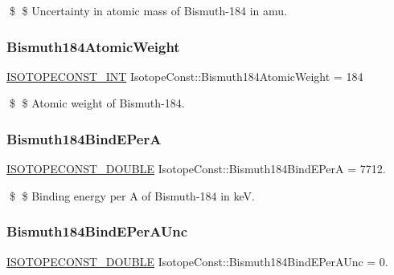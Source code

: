\$ \$ Uncertainty in atomic mass of Bismuth-\/184 in amu. \mbox{\label{group___isotope_const-_bismuth-_bi184_gae0976f524a59eb33facb56944e5ba512}} 
\subsubsection{\texorpdfstring{Bismuth184\+Atomic\+Weight}{Bismuth184AtomicWeight}}
{\footnotesize\ttfamily \mbox{\hyperlink{group___isotope_const-_macros_ga5f18360b3e99483a35c32d789e62621c}{I\+S\+O\+T\+O\+P\+E\+C\+O\+N\+S\+T\+\_\+\+I\+NT}} Isotope\+Const\+::\+Bismuth184\+Atomic\+Weight = 184}

\$ \$ Atomic weight of Bismuth-\/184. \mbox{\label{group___isotope_const-_bismuth-_bi184_ga8c356a8ee5f8ec16923a91de44a782a7}} 
\subsubsection{\texorpdfstring{Bismuth184\+Bind\+E\+PerA}{Bismuth184BindEPerA}}
{\footnotesize\ttfamily \mbox{\hyperlink{group___isotope_const-_macros_ga8f45a7272ce02c0b4c65c44636ed719a}{I\+S\+O\+T\+O\+P\+E\+C\+O\+N\+S\+T\+\_\+\+D\+O\+U\+B\+LE}} Isotope\+Const\+::\+Bismuth184\+Bind\+E\+PerA = 7712.}

\$ \$ Binding energy per A of Bismuth-\/184 in keV. \mbox{\label{group___isotope_const-_bismuth-_bi184_gae2106fa1aefe3b82407cd373b8323533}} 
\subsubsection{\texorpdfstring{Bismuth184\+Bind\+E\+Per\+A\+Unc}{Bismuth184BindEPerAUnc}}
{\footnotesize\ttfamily \mbox{\hyperlink{group___isotope_const-_macros_ga8f45a7272ce02c0b4c65c44636ed719a}{I\+S\+O\+T\+O\+P\+E\+C\+O\+N\+S\+T\+\_\+\+D\+O\+U\+B\+LE}} Isotope\+Const\+::\+Bismuth184\+Bind\+E\+Per\+A\+Unc = 0.}

